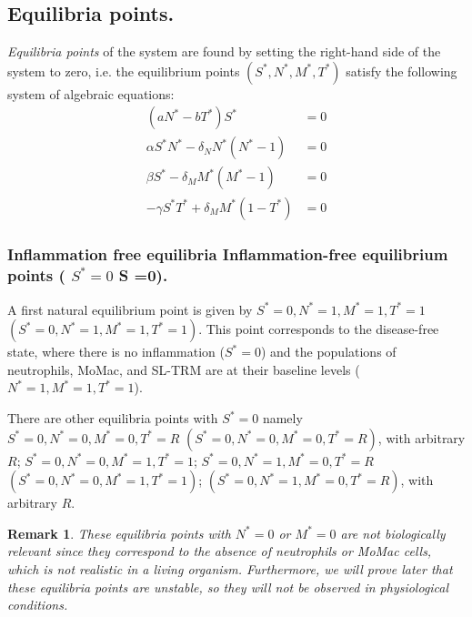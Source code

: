 \documentclass[a4paper, 12pt]{article}
\newtheorem{rem}{Remark}[section]
\providecommand{\DIFaddtex}[1]{{\protect\color{blue} \sf #1}} %
\providecommand{\DIFdeltex}[1]{{\protect\color{red} \scriptsize #1}} %
\providecommand{\DIFaddbegin}{} %
\providecommand{\DIFaddend}{} %
\providecommand{\DIFdelbegin}{} %
\providecommand{\DIFdelend}{} %
\providecommand{\DIFadd}[1]{\texorpdfstring{\DIFaddtex{#1}}{#1}} %
\providecommand{\DIFdel}[1]{\texorpdfstring{\DIFdeltex{#1}}{}} %
\begin{document}
\subsection{Equilibria points.}
\emph{Equilibria points} of the system are found by setting the right-hand side of the system to zero, i.e.
 the equilibrium points $(S^*, N^*, M^*, T^*)$ satisfy the following system of algebraic equations:
\begin{align}
(a N^* - b T^*) S^* &= 0 \label{eq:equilibrium_S} \\
\alpha S^* N^* - \delta_N N^* (N^* - 1) &= 0 \label{eq:equilibrium_N} \\
\beta S^* - \delta_M M^* (M^* - 1) &= 0 \label{eq:equilibrium_M} \\
-\gamma S^* T^* + \delta_M M^* (1 - T^*) &= 0 \label{eq:equilibrium_T}
\end{align}
\subsubsection{\DIFdelbegin \DIFdel{Inflammation free equilibria }\DIFdelend \DIFaddbegin \DIFadd{Inflammation-free equilibrium points }\DIFaddend (\DIFdelbegin \DIFdel{$S^* =0$}\DIFdelend \DIFaddbegin \DIFadd{S =0}\DIFaddend ).}\DIFaddbegin \label{sec:disease_free}
\DIFaddend A first natural equilibrium point is given by \DIFdelbegin \DIFdel{$S^* = 0, N^* = 1, M^* = 1, T^* = 1$}\DIFdelend \DIFaddbegin \DIFadd{$(S^* = 0, N^* = 1, M^* = 1, T^* = 1)$}\DIFaddend . This point corresponds to the disease-free state, where there is no inflammation ($S^* = 0$) and the populations of neutrophils, MoMac, and SL-TRM are at their baseline    levels ($N^* = 1, M^* = 1, T^* = 1$).

There are other equilibria points with $S^* = 0$  namely
\DIFdelbegin \DIFdel{$S^* = 0, N^* = 0, M^* = 0, T^* = R$}\DIFdelend \DIFaddbegin \DIFadd{$(S^* = 0, N^* = 0, M^* = 0, T^* = R)$}\DIFaddend , with arbitrary $R$;
 \DIFdelbegin \DIFdel{$S^* = 0, N^* = 0, M^* = 1, T^* = 1$;
 $S^* = 0, N^* = 1, M^* = 0, T^* = R$}\DIFdelend \DIFaddbegin \DIFadd{$(S^* = 0, N^* = 0, M^* = 1, T^* = 1)$;
 $(S^* = 0, N^* = 1, M^* = 0, T^* = R)$}\DIFaddend , with arbitrary $R$.
\begin{rem}\DIFaddbegin \label{rem:vanishing}
\DIFaddend These equilibria points with  $N^* = 0$ or $M^* = 0$ are not biologically relevant since they correspond to the absence of neutrophils or MoMac cells, which is not realistic in a living organism.
Furthermore, we will prove later that these equilibria points are unstable, so they will not be observed in physiological conditions.
\end{rem}
\end{document}
